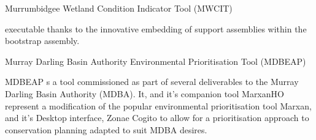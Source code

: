 \documentclass{portfolio}
\begin{document}
\begin{Projects}
\begin{Project}{Murrumbidgee Wetland Condition Indicator Tool (MWCIT)}
\begin{ProjectOverview}
        executable thanks to the innovative embedding of support assemblies within the bootstrap assembly. 
      \end{ProjectOverview}
    \end{Project}
    \begin{Project}{Murray Darling Basin Authority Environmental Prioritisation Tool (MDBEAP)}
      \begin{ProjectOverview}
        MDBEAP s a tool commissioned as part of several deliverables to the Murray Darling Basin Authority (MDBA).  It, and it's companion tool MarxanHO
        represent a modification of the popular environmental prioritisation tool Marxan, and it's Desktop interface, Zonae Cogito to allow for a 
        prioritisation approach to conservation planning adapted to suit MDBA desires.  
      \end{ProjectOverview}
    \end{Project}
  \end{Projects}
  \vfillForced
\end{document}
